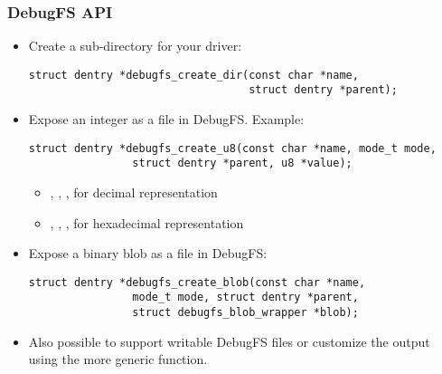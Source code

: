 \begin{frame}[fragile]
  \frametitle{DebugFS API}
  \begin{itemize}
  \item Create a sub-directory for your driver:
    \begin{verbatim}
struct dentry *debugfs_create_dir(const char *name,
                                  struct dentry *parent);
    \end{verbatim}
  \item Expose an integer as a file in DebugFS. Example:
    \begin{verbatim}
struct dentry *debugfs_create_u8(const char *name, mode_t mode,
                struct dentry *parent, u8 *value);
    \end{verbatim}
    \begin{itemize}
    \item {}, , ,  for decimal representation
    \item {}, , ,  for hexadecimal representation
    \end{itemize}
  \item Expose a binary blob as a file in DebugFS:
    \begin{verbatim}
struct dentry *debugfs_create_blob(const char *name,
                mode_t mode, struct dentry *parent,
                struct debugfs_blob_wrapper *blob);
    \end{verbatim}

  \item Also possible to support writable DebugFS files or customize
    the output using the more generic 
    function.
  \end{itemize}
\end{frame}

